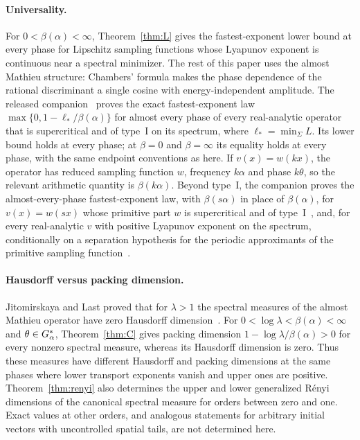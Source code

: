\paragraph{Universality.}
For $0<\beta(\alpha)<\infty$, Theorem~\ref{thm:L} gives the fastest-exponent lower bound at every phase for Lipschitz sampling functions whose Lyapunov exponent is continuous near a spectral minimizer. The rest of this paper uses the almost Mathieu structure: Chambers' formula makes the phase dependence of the rational discriminant a single cosine with energy-independent amplitude. The released companion~\cite[Theorem~A]{DMuniversality} proves the exact fastest-exponent law $\max\{0,1-\ell_*/\beta(\alpha)\}$ for almost every phase of every real-analytic operator that is supercritical and of type~I on its spectrum, where $\ell_*=\min_\Sigma L$. Its lower bound holds at every phase; at $\beta=0$ and $\beta=\infty$ its equality holds at every phase, with the same endpoint conventions as here. If $v(x)=w(kx)$, the operator has reduced sampling function $w$, frequency $k\alpha$ and phase $k\theta$, so the relevant arithmetic quantity is $\beta(k\alpha)$. Beyond type~I, the companion proves the almost-every-phase fastest-exponent law, with $\beta(s\alpha)$ in place of $\beta(\alpha)$, for $v(x)=w(sx)$ whose primitive part $w$ is supercritical and of type~I~\cite[Theorem~C]{DMuniversality}, and, for every real-analytic $v$ with positive Lyapunov exponent on the spectrum, conditionally on a separation hypothesis for the periodic approximants of the primitive sampling function~\cite[Theorem~D]{DMuniversality}.

\paragraph{Hausdorff versus packing dimension.} Jitomirskaya and Last proved that for $\lambda>1$ the spectral measures of the almost Mathieu operator have zero Hausdorff dimension~\cite{JL2000}. For $0<\log\lambda<\beta(\alpha)<\infty$ and $\theta\in G_\alpha^*$, Theorem~\ref{thm:C} gives packing dimension $1-\log\lambda/\beta(\alpha)>0$ for every nonzero spectral measure, whereas its Hausdorff dimension is zero. Thus these measures have different Hausdorff and packing dimensions at the same phases where lower transport exponents vanish and upper ones are positive. Theorem~\ref{thm:renyi} also determines the upper and lower generalized R\'enyi dimensions of the canonical spectral measure for orders between zero and one. Exact values at other orders, and analogous statements for arbitrary initial vectors with uncontrolled spatial tails, are not determined here.

